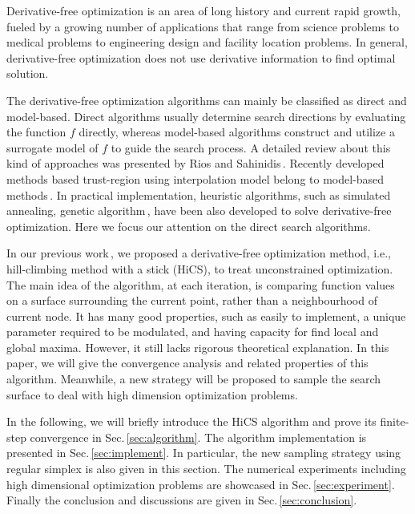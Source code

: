 \documentclass[final,1p,times]{elsarticle}
\begin{document}
Derivative-free optimization is an area of long history and
current rapid growth, fueled by a growing number of applications
that range from science problems to medical problems to
engineering design and facility location problems. 
In general, derivative-free optimization  does not use derivative
information to find optimal solution. 

The derivative-free optimization algorithms can mainly be
classified as direct and model-based.  Direct algorithms usually
determine search directions by evaluating the
function $f$ directly, whereas model-based algorithms construct
and utilize a surrogate model of $f$ to guide the search process.
A detailed review about this kind of approaches was presented by
Rios and Sahinidis\,\cite{rios2013derivative}.
Recently developed methods based trust-region using
interpolation model belong to model-based methods\,\cite{powell2000uobyqa,
powell2002trust, wu2009heuristic, zhang2014sobolev}. 
In practical implementation, heuristic algorithms, such as
simulated annealing, genetic algorithm\,\cite{michalewicz2004how}, 
have been also developed to solve derivative-free optimization.
Here we focus our attention on the direct search algorithms.

In our previous work\,\cite{huang2017hill}, we proposed a
derivative-free optimization method, i.e., hill-climbing method
with a stick (HiCS), to treat unconstrained optimization.
The main idea of the algorithm, at each iteration, is
comparing function values on a surface surrounding the current point,
rather than a neighbourhood of current node. 
It has many good properties, such as easily to implement,
a unique parameter required to be modulated, and having capacity
for find local and global maxima. However, it still lacks rigorous
theoretical explanation. 
In this paper, we will give the convergence analysis and related
properties of this algorithm. 
Meanwhile, a new strategy will be proposed to sample the search
surface to deal with high dimension optimization problems.

In the following, we will briefly introduce the HiCS algorithm and
prove its finite-step convergence in Sec.\,\ref{sec:algorithm}. 
The algorithm implementation is presented in Sec.\,\ref{sec:implement}.
In particular, the new sampling strategy using regular simplex is
also given in this section.
The numerical experiments including high dimensional optimization
problems are showcased in Sec.\,\ref{sec:experiment}. 
Finally the conclusion and discussions are given in Sec.\,\ref{sec:conclusion}.
\end{document}
